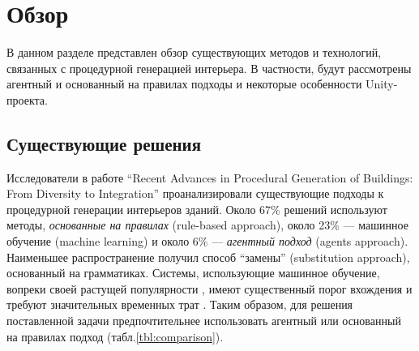 
\section{Обзор}

В данном разделе представлен обзор существующих методов и технологий, связанных с процедурной генерацией интерьера. В частности, будут рассмотрены агентный и основанный на правилах подходы и некоторые особенности Unity-проекта.


\subsection{Существующие решения}

Исследователи в работе \enquote{Recent Advances in Procedural Generation of Buildings: From Diversity to Integration} \cite{kutzias2023recent} проанализировали существующие подходы к процедурной генерации интерьеров зданий. Около 67\% решений используют методы, \textit{основанные на правилах} (rule-based approach), около 23\% --- машинное обучение (machine learning) и около 6\% --- \textit{агентный подход} (agents approach). Наименьшее распространение получил способ \enquote{замены} (substitution approach), основанный на грамматиках. Системы, использующие машинное обучение, вопреки своей растущей популярности \cite{kutzias2023recent}, имеют существенный порог вхождения и требуют значительных временных трат \cite{kan2021automatic,balint2019generalized}. Таким образом, для решения поставленной задачи предпочтительнее использовать агентный или основанный на правилах подход (табл.\ref{tbl:comparison}).

\begin{table}[b]
\begin{center}
    \caption{Сравнение методов процедурной генерации интерьеров}
    \label{tbl:comparison}
\end{center}
\end{table}

